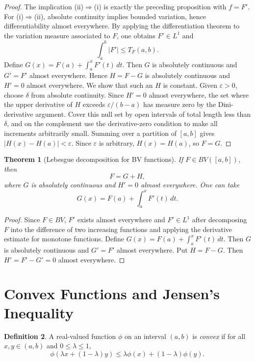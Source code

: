 \documentclass[11pt,openany]{book}
\numberwithin{equation}{chapter}
\theoremstyle{definition}
\newtheorem{definition}{Definition}[chapter]
\theoremstyle{plain}
\newtheorem{theorem}[definition]{Theorem}
\theoremstyle{remark}
\newcommand{\eps}{\varepsilon}
\newcommand{\1}{\mathbf{1}}
\newcommand{\dd}{\,d}
\newcommand{\abs}[1]{\left\lvert #1\right\rvert}
\begin{document}
\begin{proof}
The implication (ii)\(\Rightarrow\)(i) is exactly the preceding proposition with \(f=F'\).  For (i)\(\Rightarrow\)(ii), absolute continuity implies bounded variation, hence differentiability almost everywhere.  By applying the differentiation theorem to the variation measure associated to \(F\), one obtains \(F'\in L^1\) and
\[
    \int_a^b\abs{F'}\le T_F(a,b).
\]
Define \(G(x)=F(a)+\int_a^xF'(t)\dd t\).  Then \(G\) is absolutely continuous and \(G'=F'\) almost everywhere.  Hence \(H=F-G\) is absolutely continuous and \(H'=0\) almost everywhere.  We show that such an \(H\) is constant.  Given \(\eps>0\), choose \(\delta\) from absolute continuity.  Since \(H'=0\) almost everywhere, the set where the upper derivative of \(H\) exceeds \(\eps/(b-a)\) has measure zero by the Dini-derivative argument.  Cover this null set by open intervals of total length less than \(\delta\), and on the complement use the derivative-zero condition to make all increments arbitrarily small.  Summing over a partition of \([a,b]\) gives \(\abs{H(x)-H(a)}<\eps\).  Since \(\eps\) is arbitrary, \(H(x)=H(a)\), so \(F=G\).
\end{proof}

\begin{theorem}[Lebesgue decomposition for BV functions]
If \(F\in BV([a,b])\), then
\[
    F=G+H,
\]
where \(G\) is absolutely continuous and \(H' =0\) almost everywhere.  One can take
\[
    G(x)=F(a)+\int_a^x F'(t)\dd t.
\]
\end{theorem}

\begin{proof}
Since \(F\in BV\), \(F'\) exists almost everywhere and \(F'\in L^1\) after decomposing \(F\) into the difference of two increasing functions and applying the derivative estimate for monotone functions.  Define \(G(x)=F(a)+\int_a^xF'(t)\dd t\).  Then \(G\) is absolutely continuous and \(G'=F'\) almost everywhere.  Put \(H=F-G\).  Then \(H'=F'-G'=0\) almost everywhere.
\end{proof}

\section{Convex Functions and Jensen's Inequality}

\begin{definition}
A real-valued function \(\phi\) on an interval \((a,b)\) is \emph{convex} if for all \(x,y\in(a,b)\) and \(0\le\lambda\le1\),
\[
    \phi(\lambda x+(1-\lambda)y)\le \lambda\phi(x)+(1-\lambda)\phi(y).
\]
\end{definition}
\end{document}

